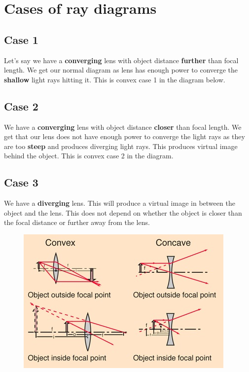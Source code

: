 \documentclass[12pt]{article}
\begin{document}
    \section*{Cases of ray diagrams}
    \subsection*{Case 1}
    Let's say we have a \textbf{converging} lens with object distance \textbf{further} than focal length.
    We get our normal diagram as lens has enough power to converge the \textbf{shallow} light rays hitting it.
    This is convex case 1 in the diagram below.

    \subsection*{Case 2}
    We have a \textbf{converging} lens with object distance \textbf{closer} than focal length.
    We get that our lens does not have enough power to converge the light rays as they are too
    \textbf{steep} and produces diverging light rays. This produces virtual image behind the object.
    This is convex case 2 in the diagram.

    \subsection*{Case 3}
    We have a \textbf{diverging} lens. This will produce a virtual image in between the object and the
    lens. This does not depend on whether the object is closer than the focal distance or further away
    from the lens.

    \begin{figure}[h]
        \includegraphics[scale = 1]{rayDiagCases.jpg} 
    \end{figure}

    
\end{document}
